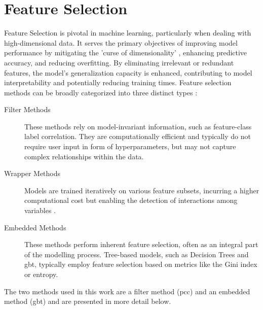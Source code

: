 \documentclass[12pt, a4paper, headinclude, twoside, plainheadsepline, open=right, numbers=noenddot, hidelinks, toc=listof, toc=bibliography]{scrreprt}
\begin{document}
\section{Feature Selection}
\label{sec:fs_algos}

Feature Selection is pivotal in machine learning, particularly when dealing with high-dimensional data. It serves the primary objectives of improving model performance by mitigating the 'curse of dimensionality' \cite{bellman1961adaptive}, enhancing predictive accuracy, and reducing overfitting. By eliminating irrelevant or redundant features, the model's generalization capacity is enhanced, contributing to model interpretability and potentially reducing training times.
Feature selection methods can be broadly categorized into three distinct types \cite{jovicReviewFeatureSelection2015}:
\begin{description}

\item[Filter Methods] These methods rely on model-invariant information, such as feature-class label correlation. They are computationally efficient and typically do not require user input in form of hyperparameters, but may not capture complex relationships within the data.

\item[Wrapper Methods] Models are trained iteratively on various feature subsets, incurring a higher computational cost but enabling the detection of interactions among variables \cite{venkateshReviewFeatureSelection2019}.

\item[Embedded Methods] These methods perform inherent feature selection, often as an integral part of the modelling process. Tree-based models, such as Decision Trees and \ac{gbt}, typically employ feature selection based on metrics like the Gini index or entropy.
\end{description}

The two methods used in this work are a filter method (\ac{pcc}) and an embedded method (\ac{gbt}) and are presented in more detail below.
\end{document}
